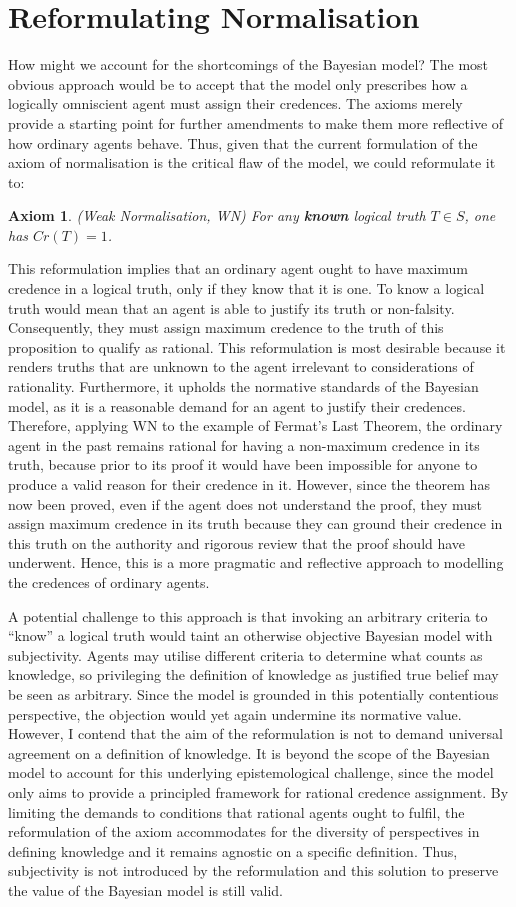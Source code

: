 \documentclass[12pt]{article}
\newtheorem{axiom}{Axiom}
\begin{document}
\section{Reformulating Normalisation}
How might we account for the shortcomings of the Bayesian model? The most obvious approach would be to accept that the model only prescribes how a logically omniscient agent must assign their credences. The axioms merely provide a starting point for further amendments to make them more reflective of how ordinary agents behave. Thus, given that the current formulation of the axiom of normalisation is the critical flaw of the model, we could reformulate it to:
\begin{axiom}
    (Weak Normalisation, WN) For any \textbf{known} logical truth $T\in S$, one has $Cr(T)=1$.
\end{axiom}
This reformulation implies that an ordinary agent ought to have maximum credence in a logical truth, only if they know that it is one.\autocite{sep} To know a logical truth would mean that an agent is able to justify its truth or non-falsity. Consequently, they must assign maximum credence to the truth of this proposition to qualify as rational. This reformulation is most desirable because it renders truths that are unknown to the agent irrelevant to considerations of rationality. Furthermore, it upholds the normative standards of the Bayesian model, as it is a reasonable demand for an agent to justify their credences. Therefore, applying WN to the example of Fermat's Last Theorem, the ordinary agent in the past remains rational for having a non-maximum credence in its truth, because prior to its proof it would have been impossible for anyone to produce a valid reason for their credence in it. However, since the theorem has now been proved, even if the agent does not understand the proof, they must assign maximum credence in its truth because they can ground their credence in this truth on the authority and rigorous review that the proof should have underwent. Hence, this is a more pragmatic and reflective approach to modelling the credences of ordinary agents.

A potential challenge to this approach is that invoking an arbitrary criteria to ``know'' a logical truth would taint an otherwise objective Bayesian model with subjectivity. Agents may utilise different criteria to determine what counts as knowledge, so privileging the definition of knowledge as justified true belief may be seen as arbitrary. Since the model is grounded in this potentially contentious perspective, the objection would yet again undermine its normative value. However, I contend that the aim of the reformulation is not to demand universal agreement on a definition of knowledge. It is beyond the scope of the Bayesian model to account for this underlying epistemological challenge, since the model only aims to provide a principled framework for rational credence assignment. By limiting the demands to conditions that rational agents ought to fulfil, the reformulation of the axiom accommodates for the diversity of perspectives in defining knowledge and it remains agnostic on a specific definition. Thus, subjectivity is not introduced by the reformulation and this solution to preserve the value of the Bayesian model is still valid.
\end{document}
